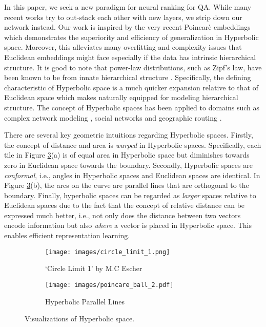 \documentclass[sigconf]{acmart}
\begin{document}
In this paper, we seek a new paradigm for neural ranking for QA. While many recent works try to out-stack each other with new layers, we strip down our network instead. Our work is inspired by the very recent Poincar\`e embeddings \cite{DBLP:journals/corr/NickelK17} which demonstrates the superiority and efficiency of generalization in Hyperbolic space.  Moreover, this alleviates many overfitting and complexity issues that Euclidean embeddings might face especially if the data has intrinsic hierarchical structure. It is good to note that power-law distributions, such as Zipf's law, have been known to be from innate hierarchical structure \cite{ravasz2003hierarchical}. Specifically, the defining characteristic of Hyperbolic space is a much quicker expansion relative to that of Euclidean space which makes naturally equipped for modeling hierarchical structure. The concept of Hyperbolic spaces has been applied to domains such as complex network modeling \cite{DBLP:journals/corr/abs-1006-5169}, social networks \cite{verbeek2016metric} and geographic routing \cite{DBLP:conf/infocom/Kleinberg07}. 

There are several key geometric intuitions regarding Hyperbolic spaces. Firstly, the concept of distance and area is \textit{warped} in Hyperbolic spaces. Specifically, each tile in Figure \ref{fig:hyp}(a) is of equal area in Hyperbolic space but diminishes towards zero in Euclidean space towards the boundary. Secondly, Hyperbolic spaces are \textit{conformal}, i.e., angles in Hyperbolic spaces and Euclidean spaces are identical. In Figure \ref{fig:hyp}(b), the arcs on the curve are parallel lines that are orthogonal to the boundary. Finally, hyperbolic spaces can be regarded as \textit{larger} spaces relative to Euclidean spaces due to the fact that the concept of relative distance can be expressed much better, i.e., not only does the distance between two vectors encode information but also \textit{where} a vector is placed in Hyperbolic space. This enables efficient representation learning. 


\begin{figure}
\centering
\begin{subfigure}{0.25\textwidth}
  \centering
  \texttt{[image: images/circle\_limit\_1.png]}
  \caption{`Circle Limit 1' by M.C Escher}
  \label{fig:sub1}
\end{subfigure}\begin{subfigure}{0.25\textwidth}
  \centering
  \texttt{[image: images/poincare\_ball\_2.pdf]}
  \caption{Hyperbolic Parallel Lines}
  \label{fig:sub2}
\end{subfigure}
\caption{Visualizations of Hyperbolic space.}
\label{fig:hyp}
\end{figure}
\end{document}
